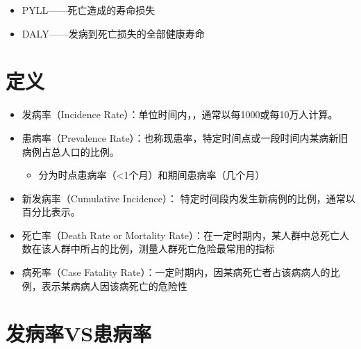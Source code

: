 \documentclass[
]{book}
\providecommand{\tightlist}{%
  \setlength{\itemsep}{0pt}\setlength{\parskip}{0pt}}
\theoremstyle{definition}
\theoremstyle{definition}
\theoremstyle{definition}
\theoremstyle{definition}
\theoremstyle{remark}
\begin{document}
\begin{itemize}
\tightlist
\item
  PYLL------死亡造成的寿命损失
\item
  DALY------发病到死亡损失的全部健康寿命
\end{itemize}

\hypertarget{ux5b9aux4e49}{%
\section{定义}\label{ux5b9aux4e49}}

\begin{itemize}
\tightlist
\item
  发病率（Incidence Rate）：单位时间内，，通常以每1000或每10万人计算。
\item
  患病率（Prevalence Rate）：也称现患率，特定时间点或一段时间内某病新旧病例占总人口的比例。

  \begin{itemize}
  \tightlist
  \item
    分为时点患病率（\textless1个月）和期间患病率（几个月）
  \end{itemize}
\item
  新发病率（Cumulative Incidence）： 特定时间段内发生新病例的比例，通常以百分比表示。
\item
  死亡率（Death Rate or Mortality Rate）：在一定时期内，某人群中总死亡人数在该人群中所占的比例，测量人群死亡危险最常用的指标
\item
  病死率（Case Fatality Rate）：一定时期内，因某病死亡者占该病病人的比例，表示某病病人因该病死亡的危险性
\end{itemize}

\hypertarget{ux53d1ux75c5ux7387vsux60a3ux75c5ux7387}{%
\section{发病率VS患病率}\label{ux53d1ux75c5ux7387vsux60a3ux75c5ux7387}}
\end{document}
